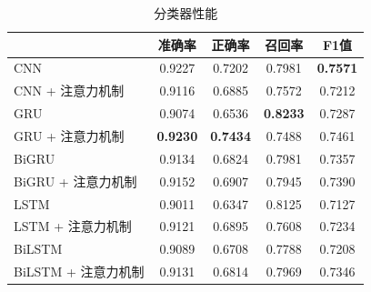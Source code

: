 \begin{table}[htb]
  \centering
  \begin{minipage}[t]{0.8\linewidth}
  \caption{分类器性能}
  \label{tab:exp_context_emo_b_result}
    \begin{tabularx}{\linewidth}{X|cccc}
    \toprule[1.5pt]
    & 准确率 & 正确率 & 召回率 & F1值 \\
    \hline
    CNN & 0.9227 & 0.7202 & 0.7981 & \bf 0.7571 \\ %
    CNN + 注意力机制 & 0.9116 & 0.6885 & 0.7572 & 0.7212 \\ %
    \hline
    GRU & 0.9074 & 0.6536 & \bf 0.8233 & 0.7287 \\ %
    GRU + 注意力机制 & \bf 0.9230 & \bf 0.7434 & 0.7488 & 0.7461 \\ %
    \hline
    BiGRU & 0.9134 & 0.6824 & 0.7981 & 0.7357 \\ %
    BiGRU + 注意力机制 & 0.9152 & 0.6907 & 0.7945 & 0.7390 \\ %
    \hline
    LSTM & 0.9011 & 0.6347 & 0.8125 & 0.7127 \\ %
    LSTM + 注意力机制 & 0.9121 & 0.6895 & 0.7608 & 0.7234 \\ %
    \hline
    BiLSTM & 0.9089 & 0.6708 & 0.7788 & 0.7208 \\ %
    BiLSTM + 注意力机制 & 0.9131 & 0.6814 & 0.7969 & 0.7346 \\ %
    \bottomrule[1.5pt]
    \end{tabularx}
  \end{minipage}
\end{table}

